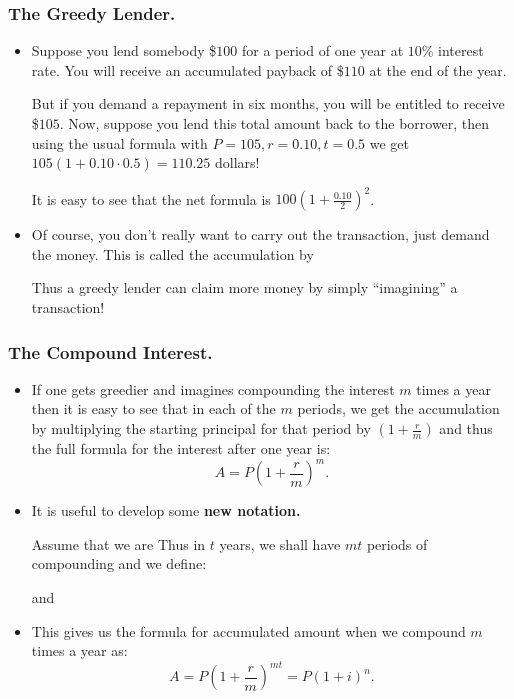 %


\begin{frame}%
  \frametitle{The Greedy Lender.}
  \begin{itemize}%
 

\item Suppose you lend somebody \$$100$ for a period of one year at
$10$\% interest rate. You will receive an accumulated payback of \$$110$
at the end of the year.

But if you demand a repayment in six months, you will be entitled to
receive \$$105$. Now, suppose you lend this total amount back to the
borrower, then using the usual formula with $P=105, r=0.10, t=0.5$ we
get $105(1+0.10\cdot 0.5) = 110.25$ dollars!

It is easy to see that the net formula is $100(1+\frac{0.10}{2})^2$.

\item Of course, you don't really want to carry out the transaction,
just demand the money. This is called the accumulation by

Thus a greedy lender can claim more money by simply ``imagining'' a
transaction!



\end{itemize}
\end{frame}



%

\begin{frame}%
 \frametitle{The Compound Interest.}
  \begin{itemize}%
 
\item 
If one gets greedier and imagines compounding the interest $m$ times a
year then it is easy to see that in each of the $m$ periods, we get the
accumulation by multiplying the starting principal for that period by
$(1+\frac{r}{m})$ and thus the full formula for the interest after one
year is: 
$$A=P\left(1+\frac{r}{m}\right)^m.$$

\item It is useful to develop some {\bf new notation.}

Assume that we are  Thus in $t$
years, we shall have $mt$ periods of compounding and we define:

 and 

\item This gives us the formula for accumulated amount when we compound
$m$ times a year as:
$$A = P\left(1+\frac{r}{m}\right)^{mt} = P(1+i)^n.$$



\end{itemize}
\end{frame}

